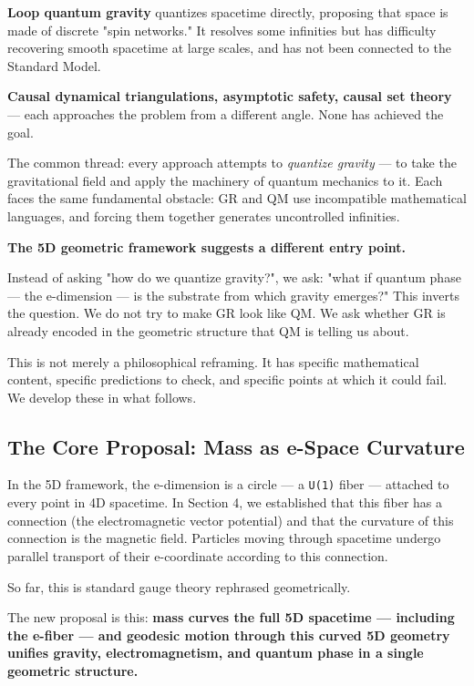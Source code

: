 \documentclass[aps,prd,preprint,superscriptaddress,longbibliography,floatfix]{revtex4-2}
\theoremstyle{remark}
\begin{document}
\textbf{Loop quantum gravity} quantizes spacetime directly, proposing that space is made of discrete "spin networks." It resolves some infinities but has difficulty recovering smooth spacetime at large scales, and has not been connected to the Standard Model.

\textbf{Causal dynamical triangulations, asymptotic safety, causal set theory} --- each approaches the problem from a different angle. None has achieved the goal.

The common thread: every approach attempts to \textit{quantize gravity} --- to take the gravitational field and apply the machinery of quantum mechanics to it. Each faces the same fundamental obstacle: GR and QM use incompatible mathematical languages, and forcing them together generates uncontrolled infinities.

\textbf{The 5D geometric framework suggests a different entry point.}

Instead of asking "how do we quantize gravity?", we ask: "what if quantum phase --- the e-dimension --- is the substrate from which gravity emerges?" This inverts the question. We do not try to make GR look like QM. We ask whether GR is already encoded in the geometric structure that QM is telling us about.

This is not merely a philosophical reframing. It has specific mathematical content, specific predictions to check, and specific points at which it could fail. We develop these in what follows.



\subsection{The Core Proposal: Mass as e-Space Curvature}

In the 5D framework, the e-dimension is a circle --- a \texttt{U(1)} fiber --- attached to every point in 4D spacetime. In Section 4, we established that this fiber has a connection (the electromagnetic vector potential) and that the curvature of this connection is the magnetic field. Particles moving through spacetime undergo parallel transport of their e-coordinate according to this connection.

So far, this is standard gauge theory rephrased geometrically.

The new proposal is this: \textbf{mass curves the full 5D spacetime --- including the e-fiber --- and geodesic motion through this curved 5D geometry unifies gravity, electromagnetism, and quantum phase in a single geometric structure.}
\end{document}
